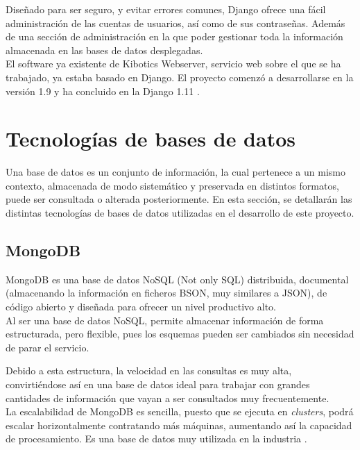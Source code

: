 \documentclass[a4paper, 12pt]{book}
\begin{document}
		Diseñado para ser seguro, y evitar errores comunes, Django ofrece una fácil administración de las cuentas de usuarios, así como de sus contraseñas. Además de una sección de administración en la que poder gestionar toda la información almacenada en las bases de datos desplegadas.\\
		
		
		El software ya existente de Kibotics Webserver, servicio web sobre el que se ha trabajado, ya estaba basado en Django. El proyecto comenzó a desarrollarse en la versión 1.9 y ha concluido en la Django 1.11  \cite{Django}.
		
	
	\section{Tecnologías de bases de datos} 
	\label{sec:tecnologias_bases_de_datos} 
		Una base de datos es un conjunto de información, la cual pertenece a un mismo contexto, almacenada de modo sistemático y preservada en distintos formatos, puede ser consultada o alterada posteriormente. En esta sección, se detallarán las distintas tecnologías de bases de datos utilizadas en el desarrollo de este proyecto.
		
	\subsection{MongoDB}
	\label{subsec:mongodb}
		MongoDB \cite{MongoDB} es una base de datos NoSQL (Not only SQL) distribuida, documental (almacenando la información en ficheros BSON, muy similares a JSON), de código abierto y diseñada para ofrecer un nivel productivo alto.\\
		
		Al ser una base de datos NoSQL, permite almacenar información de forma estructurada, pero flexible, pues los esquemas pueden ser cambiados sin necesidad de parar el servicio.
		
		Debido a esta estructura, la velocidad en las consultas es muy alta, convirtiéndose así en una base de datos ideal para trabajar con grandes cantidades de información que vayan a ser consultados muy frecuentemente.\\
		
		La escalabilidad de MongoDB es sencilla, puesto que se ejecuta en \textit{clusters}, podrá escalar horizontalmente contratando más máquinas, aumentando así la capacidad de procesamiento. Es una base de datos muy utilizada en la industria \cite{Use_MongoDB}.\\
		
\end{document}
